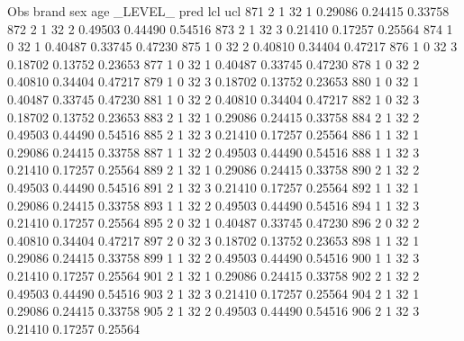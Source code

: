 \documentclass{article}
\begin{document}
\begin{Woutput}
 Obs    brand    sex    age    _LEVEL_      pred       lcl        ucl
 871      2       1      32       1       0.29086    0.24415    0.33758
 872      2       1      32       2       0.49503    0.44490    0.54516
 873      2       1      32       3       0.21410    0.17257    0.25564
 874      1       0      32       1       0.40487    0.33745    0.47230
 875      1       0      32       2       0.40810    0.34404    0.47217
 876      1       0      32       3       0.18702    0.13752    0.23653
 877      1       0      32       1       0.40487    0.33745    0.47230
 878      1       0      32       2       0.40810    0.34404    0.47217
 879      1       0      32       3       0.18702    0.13752    0.23653
 880      1       0      32       1       0.40487    0.33745    0.47230
 881      1       0      32       2       0.40810    0.34404    0.47217
 882      1       0      32       3       0.18702    0.13752    0.23653
 883      2       1      32       1       0.29086    0.24415    0.33758
 884      2       1      32       2       0.49503    0.44490    0.54516
 885      2       1      32       3       0.21410    0.17257    0.25564
 886      1       1      32       1       0.29086    0.24415    0.33758
 887      1       1      32       2       0.49503    0.44490    0.54516
 888      1       1      32       3       0.21410    0.17257    0.25564
 889      2       1      32       1       0.29086    0.24415    0.33758
 890      2       1      32       2       0.49503    0.44490    0.54516
 891      2       1      32       3       0.21410    0.17257    0.25564
 892      1       1      32       1       0.29086    0.24415    0.33758
 893      1       1      32       2       0.49503    0.44490    0.54516
 894      1       1      32       3       0.21410    0.17257    0.25564
 895      2       0      32       1       0.40487    0.33745    0.47230
 896      2       0      32       2       0.40810    0.34404    0.47217
 897      2       0      32       3       0.18702    0.13752    0.23653
 898      1       1      32       1       0.29086    0.24415    0.33758
 899      1       1      32       2       0.49503    0.44490    0.54516
 900      1       1      32       3       0.21410    0.17257    0.25564
 901      2       1      32       1       0.29086    0.24415    0.33758
 902      2       1      32       2       0.49503    0.44490    0.54516
 903      2       1      32       3       0.21410    0.17257    0.25564
 904      2       1      32       1       0.29086    0.24415    0.33758
 905      2       1      32       2       0.49503    0.44490    0.54516
 906      2       1      32       3       0.21410    0.17257    0.25564

\end{Woutput}
\end{document}
